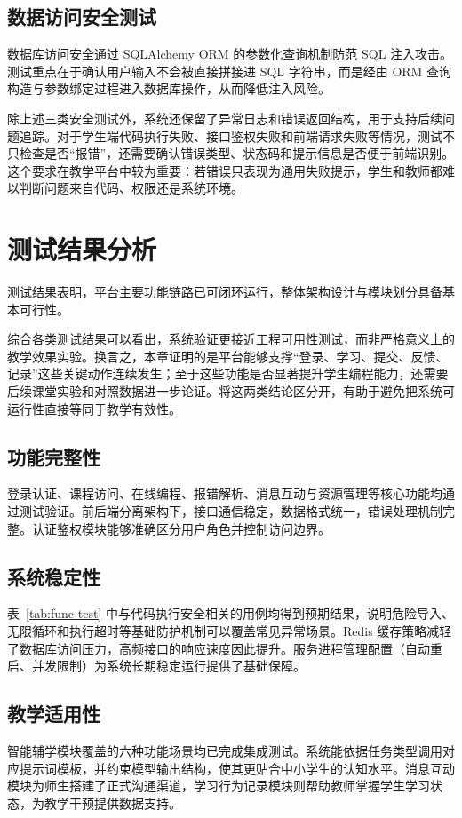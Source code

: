 \subsection{数据访问安全测试}
数据库访问安全通过 SQLAlchemy ORM 的参数化查询机制防范 SQL 注入攻击。测试重点在于确认用户输入不会被直接拼接进 SQL 字符串，而是经由 ORM 查询构造与参数绑定过程进入数据库操作，从而降低注入风险。

除上述三类安全测试外，系统还保留了异常日志和错误返回结构，用于支持后续问题追踪。对于学生端代码执行失败、接口鉴权失败和前端请求失败等情况，测试不只检查是否“报错”，还需要确认错误类型、状态码和提示信息是否便于前端识别。这个要求在教学平台中较为重要：若错误只表现为通用失败提示，学生和教师都难以判断问题来自代码、权限还是系统环境。

\section{测试结果分析}
测试结果表明，平台主要功能链路已可闭环运行，整体架构设计与模块划分具备基本可行性。

综合各类测试结果可以看出，系统验证更接近工程可用性测试，而非严格意义上的教学效果实验。换言之，本章证明的是平台能够支撑“登录、学习、提交、反馈、记录”这些关键动作连续发生；至于这些功能是否显著提升学生编程能力，还需要后续课堂实验和对照数据进一步论证。将这两类结论区分开，有助于避免把系统可运行性直接等同于教学有效性。

\subsection{功能完整性}
登录认证、课程访问、在线编程、报错解析、消息互动与资源管理等核心功能均通过测试验证。前后端分离架构下，接口通信稳定，数据格式统一，错误处理机制完整。认证鉴权模块能够准确区分用户角色并控制访问边界。

\subsection{系统稳定性}
表~\ref{tab:func-test} 中与代码执行安全相关的用例均得到预期结果，说明危险导入、无限循环和执行超时等基础防护机制可以覆盖常见异常场景。Redis 缓存策略减轻了数据库访问压力，高频接口的响应速度因此提升。服务进程管理配置（自动重启、并发限制）为系统长期稳定运行提供了基础保障。

\subsection{教学适用性}
智能辅学模块覆盖的六种功能场景均已完成集成测试。系统能依据任务类型调用对应提示词模板，并约束模型输出结构，使其更贴合中小学生的认知水平。消息互动模块为师生搭建了正式沟通渠道，学习行为记录模块则帮助教师掌握学生学习状态，为教学干预提供数据支持。

